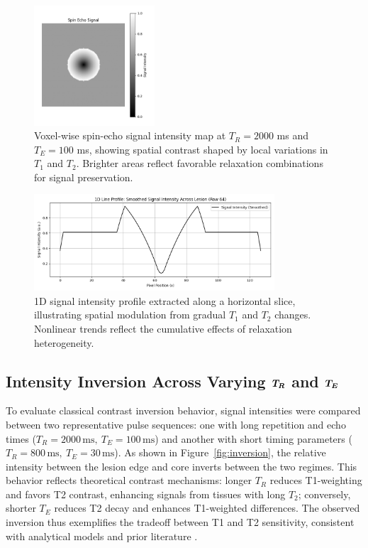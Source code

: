 \documentclass[10pt,a4paper,twoside]{article}
\begin{document}
\begin{figure}[htbp!]
\centering
\includegraphics[width=0.4\textwidth]{figures/signalintensitymap.png}
\caption{Voxel-wise spin-echo signal intensity map at $T_R = 2000$ ms and $T_E = 100$ ms, showing spatial contrast shaped by local variations in $T_1$ and $T_2$. Brighter areas reflect favorable relaxation combinations for signal preservation.}
\label{fig:signalmap}
\end{figure}

\begin{figure}[htbp!]
\centering
\includegraphics[width=0.8\textwidth]{figures/1Dlineprofilesignal.png}
\caption{1D signal intensity profile extracted along a horizontal slice, illustrating spatial modulation from gradual $T_1$ and $T_2$ changes. Nonlinear trends reflect the cumulative effects of relaxation heterogeneity.}
\label{fig:lineprofile}
\end{figure}

\subsection{Intensity Inversion Across Varying $\vb*{T_R}$ and $\vb*{T_E}$}

To evaluate classical contrast inversion behavior, signal intensities were compared between two representative pulse sequences: one with long repetition and echo times (\( T_R = 2000 \, \mathrm{ms},\ T_E = 100 \, \mathrm{ms} \)) and another with short timing parameters (\( T_R = 800 \, \mathrm{ms},\ T_E = 30 \, \mathrm{ms} \)). As shown in Figure~\ref{fig:inversion}, the relative intensity between the lesion edge and core inverts between the two regimes. This behavior reflects theoretical contrast mechanisms: longer \( T_R \) reduces T1-weighting and favors T2 contrast, enhancing signals from tissues with long \( T_2 \); conversely, shorter \( T_E \) reduces T2 decay and enhances T1-weighted differences. The observed inversion thus exemplifies the tradeoff between T1 and T2 sensitivity, consistent with analytical models and prior literature \cite{brown2014}.
\end{document}
